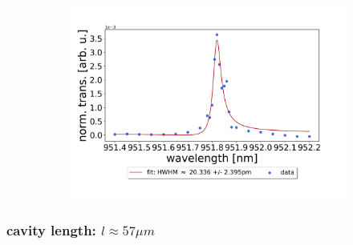 \begin{figure}[h!]
\begin{subfigure}[b]{0.49\textwidth}
        \includegraphics[width=\textwidth]{figures/results/single fano fits/120um_M5_fit_3.png}
        \caption{}
        \label{fig:120um_M5_fit_3}
    \end{subfigure}
\end{figure}

\clearpage
\subsubsection*{cavity length: $l \approx 57 \mu m$}


